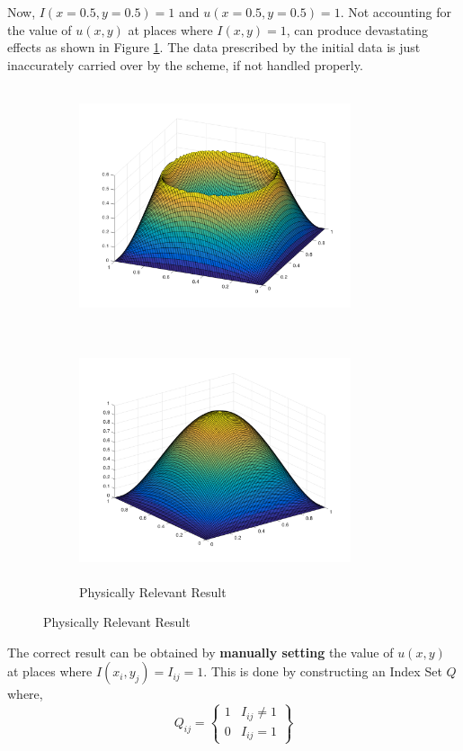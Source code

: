 \documentclass[11pt]{article}
\begin{document}
	\noindent
	Now, $I(x=0.5,y=0.5) = 1$ and $u(x=0.5,y=0.5) = 1$. Not accounting for the value of $u(x,y)$ at places where $I(x,y) = 1$, can produce devastating effects as shown in Figure \ref{fig:2}. The data prescribed by the initial data is just inaccurately carried over by the scheme, if not handled properly.
	\begin{figure}[h!]
		\begin{subfigure}{0.5\textwidth}
			\centering
			\includegraphics[width = 8cm, height = 7cm]{wrong.png}
			\label{fig:2}
		\end{subfigure}
		\begin{subfigure}{0.5\textwidth}
			\centering
			\includegraphics[width = 8cm, height = 7cm]{correct.png}
			\caption{Physically Relevant Result}
			\label{fig:3}
		\end{subfigure}
	\end{figure}
	The correct result can be obtained by \textbf{manually setting} the value of $u(x,y)$ at places where $I(x_i,y_j) = I_{ij} = 1$. This is done by constructing an Index Set $Q$ where,
	\begin{equation}
		Q_{ij} = \begin{Bmatrix}
		1 & I_{ij} \ne 1\\
		0 & I_{ij} = 1
		\end{Bmatrix}		
	\end{equation}
	
\end{document}
